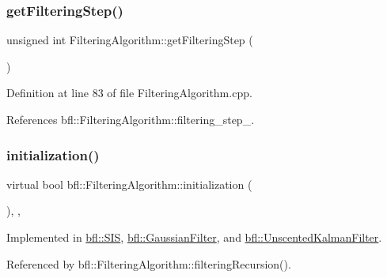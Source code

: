 \subsubsection{\texorpdfstring{get\+Filtering\+Step()}{getFilteringStep()}}
{\footnotesize\ttfamily unsigned int Filtering\+Algorithm\+::get\+Filtering\+Step (\begin{DoxyParamCaption}{ }\end{DoxyParamCaption})\hspace{0.3cm}{\ttfamily [inherited]}}



Definition at line 83 of file Filtering\+Algorithm.\+cpp.



References bfl\+::\+Filtering\+Algorithm\+::filtering\+\_\+step\+\_\+.

\mbox{\label{classbfl_1_1FilteringAlgorithm_adebe2ec2372f97a2a5baecf8c2c2a9c9}} 
\subsubsection{\texorpdfstring{initialization()}{initialization()}}
{\footnotesize\ttfamily virtual bool bfl\+::\+Filtering\+Algorithm\+::initialization (\begin{DoxyParamCaption}{ }\end{DoxyParamCaption})\hspace{0.3cm}{\ttfamily [protected]}, {}, {\ttfamily [inherited]}}



Implemented in \mbox{\hyperlink{classbfl_1_1SIS_a59e4f35fc05d2088e6dc13d622cafd1d}{bfl\+::\+S\+IS}}, \mbox{\hyperlink{classbfl_1_1GaussianFilter_ac0305fa835af89ba5962ee1211d4d0c0}{bfl\+::\+Gaussian\+Filter}}, and \mbox{\hyperlink{classbfl_1_1UnscentedKalmanFilter_ad221e4abd58c2e67e9b44f52a0c9504f}{bfl\+::\+Unscented\+Kalman\+Filter}}.



Referenced by bfl\+::\+Filtering\+Algorithm\+::filtering\+Recursion().

\mbox{\label{classbfl_1_1FilteringAlgorithm_a5cfecab2c778620e2557237472bb1721}} 
